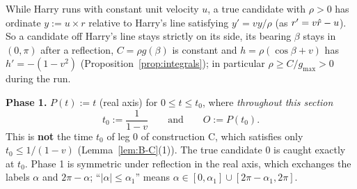 While Harry runs with constant unit velocity $u$, a true candidate with $\rho>0$ has ordinate $y:=u\times r$ relative to Harry's line
satisfying $y'=vy/\rho$ (as $r'=v\hat r-u$). So a candidate off Harry's line stays strictly on its side, its bearing $\beta$ stays in
$(0,\pi)$ after a reflection, $C=\rho g(\beta)$ is constant and $h=\rho(\cos\beta+v)$ has $h'=-(1-v^2)$
(Proposition~\ref{prop:integrals}); in particular $\rho\ge C/g_{\max}>0$ during the run.

\medskip\noindent\textbf{Phase 1.} $P(t):=t$ (real axis) for $0\le t\le t_0$, where \emph{throughout this section}
\[
t_0:=\frac1{1-v}\qquad\text{and}\qquad O:=P(t_0).
\]
This is \textbf{not} the time $t_0$ of leg $0$ of construction C, which satisfies only $t_0\le1/(1-v)$ (Lemma~\ref{lem:B-C}(1)). The
true candidate $0$ is caught exactly at $t_0$. Phase 1 is symmetric under reflection in the real axis, which exchanges the labels
$\alpha$ and $2\pi-\alpha$; ``$|\alpha|\le\alpha_1$'' means $\alpha\in[0,\alpha_1]\cup[2\pi-\alpha_1,2\pi]$.

